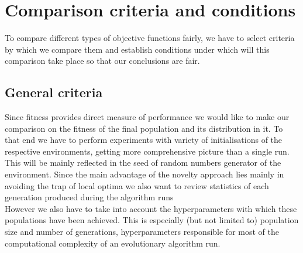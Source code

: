\chapter{Comparison criteria and conditions}
\label{ch:setup}
To compare different types of objective functions fairly, we have to select criteria by which we compare them and establish conditions under which will this comparison take place so that our conclusions are fair.
\section{General criteria}
Since fitness provides direct measure of performance we would like to make our comparison on the fitness of the final population and its distribution in it. To that end we have to perform experiments with variety of initialisations of the respective environments, getting more comprehensive picture than a single run. This will be mainly reflected in the seed of random numbers generator of the environment. Since the main advantage of the novelty approach lies mainly in avoiding the trap of local optima we also want to review statistics of each generation produced during the algorithm runs\\
However we also have to take into account the hyperparameters with which these populations have been achieved. This is especially (but not limited to) population size and number of generations, hyperparameters responsible for most of the computational complexity of an evolutionary algorithm run. 
